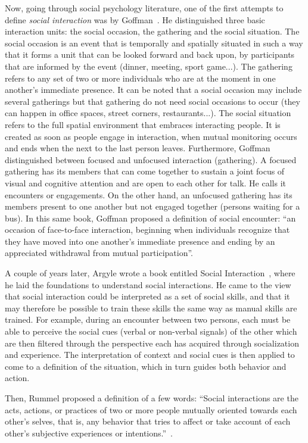 \documentclass[a4paper,11pt,twoside]{StyleThese}
\begin{document}
Now, going through social psychology literature, one of the first attempts to define \emph{social interaction} was by Goffman~\cite{goffman_1967_interaction}. He distinguished three basic interaction units: the social occasion, the gathering and the social situation. The social occasion is an event that is temporally and spatially situated in such a way that it forms a unit that can be looked forward and back upon, by participants that are informed by the event (dinner, meeting, sport game...). The gathering refers to any set of two or more individuals who are at the moment in one another’s immediate presence. It can be noted that a social occasion may include several gatherings but that gathering do not need social occasions to occur (they can happen in office spaces, street corners, restaurants...). The social situation refers to the full spatial environment that embraces interacting people. It is created as soon as people engage in interaction, when mutual monitoring occurs and ends when the next to the last person leaves. Furthermore, Goffman distinguished between focused and unfocused interaction (gathering). A focused gathering has its members that can come together to sustain a joint focus of visual and cognitive attention and are open to each other for talk. He calls it encounters or engagements. On the other hand, an unfocused gathering has its members present to one another but not engaged together (\eg persons waiting for a bus). In this same book, Goffman proposed a definition of social encounter: ``an occasion of face-to-face interaction, beginning when individuals recognize that they have moved into one another’s immediate presence and ending by an appreciated withdrawal from mutual participation''.

A couple of years later, Argyle wrote a book entitled Social Interaction~\cite{argyle_1973_social}, where he laid the foundations to understand social interactions. He came to the view that social interaction could be interpreted as a set of social skills, and that it may therefore be possible to train these skills the same way as manual skills are trained. For example, during an encounter between two persons, each must be able to perceive the social cues (verbal or non-verbal signals) of the other which are then filtered through the perspective each has acquired through socialization and experience. The interpretation of context and social cues is then applied to come to a definition of the situation, which in turn guides both behavior and action.

Then, Rummel proposed a definition of a few words: ``Social interactions are the acts, actions, or practices of two or more people mutually oriented towards each other's selves, that is, any behavior that tries to affect or take account of each other's subjective experiences or intentions.''~\cite{rummel_1976_understanding}.
\end{document}
